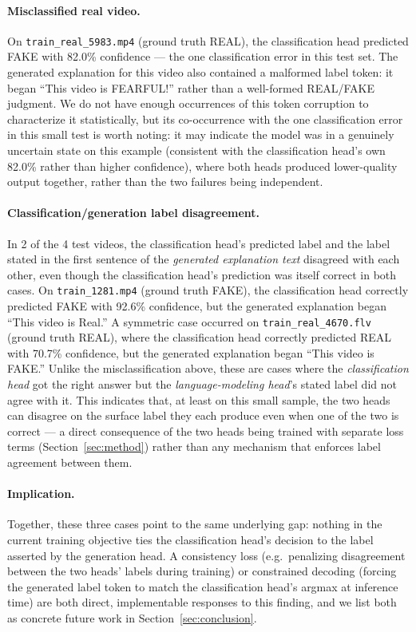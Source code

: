 \documentclass[acmsmall,review=false]{acmart}
\begin{document}
\paragraph{Misclassified real video.} On \texttt{train\_real\_5983.mp4} (ground
truth REAL), the classification head predicted FAKE with 82.0\% confidence ---
the one classification error in this test set. The generated explanation for
this video also contained a malformed label token: it began ``This video is
FEARFUL!'' rather than a well-formed REAL/FAKE judgment. We do not have enough
occurrences of this token corruption to characterize it statistically, but its
co-occurrence with the one classification error in this small test is worth
noting: it may indicate the model was in a genuinely uncertain state on this
example (consistent with the classification head's own 82.0\% rather than
higher confidence), where both heads produced lower-quality output together,
rather than the two failures being independent.

\paragraph{Classification/generation label disagreement.} In 2 of the 4 test
videos, the classification head's predicted label and the label stated in the
first sentence of the \emph{generated explanation text} disagreed with each
other, even though the classification head's prediction was itself correct in
both cases. On \texttt{train\_1281.mp4} (ground truth FAKE), the classification
head correctly predicted FAKE with 92.6\% confidence, but the generated
explanation began ``This video is Real.'' A symmetric case occurred on
\texttt{train\_real\_4670.flv} (ground truth REAL), where the classification
head correctly predicted REAL with 70.7\% confidence, but the generated
explanation began ``This video is FAKE.'' Unlike the misclassification above,
these are cases where the \emph{classification head} got the right answer but
the \emph{language-modeling head}'s stated label did not agree with it. This
indicates that, at least on this small sample, the two heads can disagree on
the surface label they each produce even when one of the two is correct --- a
direct consequence of the two heads being trained with separate loss terms
(Section~\ref{sec:method}) rather than any mechanism that enforces label
agreement between them.

\paragraph{Implication.} Together, these three cases point to the same
underlying gap: nothing in the current training objective ties the
classification head's decision to the label asserted by the generation head.
A consistency loss (e.g.\ penalizing disagreement between the two heads'
labels during training) or constrained decoding (forcing the generated label
token to match the classification head's argmax at inference time) are both
direct, implementable responses to this finding, and we list both as concrete
future work in Section~\ref{sec:conclusion}.
\end{document}
